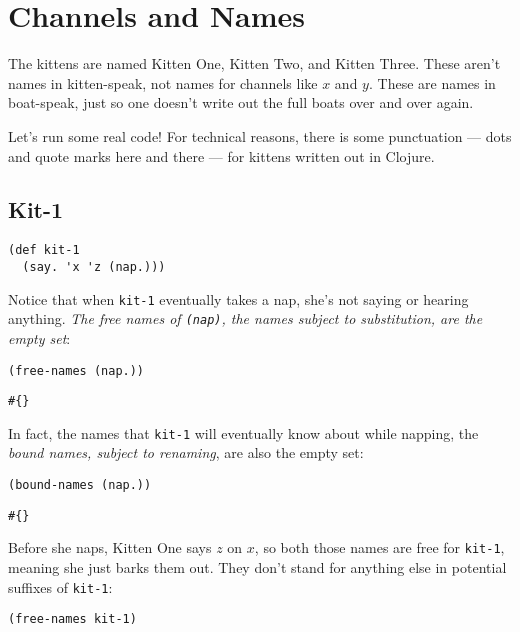 \documentclass[10pt,oneside,x11names]{article}
\theoremstyle{definition}
\theoremstyle{warning}
\begin{document}
\section{Channels and Names}
\label{sec:orgbd88d1a}

The kittens are named Kitten One, Kitten Two, and Kitten
Three. These aren't names in kitten-speak, not names for
channels like \(x\) and \(y\). These are names in boat-speak, just
so one doesn't write out the full boats over and over again.

Let's run some real code! For technical reasons, there is some
punctuation --- dots and quote marks here and there --- for
kittens written out in Clojure.

\subsection{Kit-1}
\label{sec:org09597b1}

\vskip 0.26cm
\begin{verbatim}
(def kit-1
  (say. 'x 'z (nap.)))
\end{verbatim}

Notice that when \texttt{kit-1} eventually takes a nap, she's not
saying or hearing anything. \emph{The free names of \texttt{(nap)}, the
names subject to substitution, are the empty set}:

\vskip 0.26cm
\begin{verbatim}
(free-names (nap.))
\end{verbatim}

\begin{verbatim}
#{}
\end{verbatim}


In fact, the names that \texttt{kit-1} will eventually know about while
napping, the \emph{bound names, subject to renaming}, are also the
empty set:

\vskip 0.26cm
\begin{verbatim}
(bound-names (nap.))
\end{verbatim}

\begin{verbatim}
#{}
\end{verbatim}


Before she naps, Kitten One says \(z\) on \(x\), so both those names
are free for \texttt{kit-1}, meaning she just barks them out. They don't
stand for anything else in potential suffixes of \texttt{kit-1}:

\vskip 0.26cm
\begin{verbatim}
(free-names kit-1)
\end{verbatim}
\end{document}
